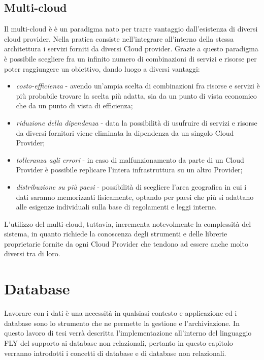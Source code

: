\subsection{Multi-cloud}
Il multi-cloud è è un paradigma nato per trarre vantaggio dall'esistenza di diversi cloud provider. Nella pratica consiste nell'integrare all'interno della stessa architettura i servizi forniti da diversi Cloud provider. Grazie a questo paradigma è possibile scegliere fra un infinito numero di combinazioni di servizi e risorse per poter raggiungere un obiettivo, dando luogo a diversi vantaggi:
\begin{itemize}
    
    \item \textit{costo-efficienza} - avendo un'ampia scelta di combinazioni fra risorse e servizi è più probabile trovare la scelta più adatta, sia da un punto di vista economico che da un punto di vista di efficienza;
    \item \textit{riduzione della dipendenza} - data la possibilità di usufruire di servizi e risorse da diversi fornitori viene eliminata la dipendenza da un singolo Cloud Provider;
    \item \textit{tolleranza agli errori} - in caso di malfunzionamento da parte di un Cloud Provider è possibile replicare l'intera infrastruttura su un altro Provider;
    \item \textit{distribuzione su più paesi} - possibilità di scegliere l'area geografica in cui i dati saranno memorizzati fisicamente, optando per paesi che più si adattano alle esigenze individuali sulla base di regolamenti e leggi interne.

\end{itemize}
L'utilizzo del multi-cloud, tuttavia, incrementa notevolmente la complessità del sistema, in quanto richiede la conoscenza degli strumenti e delle librerie proprietarie fornite da ogni Cloud Provider che tendono ad essere anche molto diversi tra di loro.

\section{Database}
Lavorare con i dati è una necessità in qualsiasi contesto e applicazione ed i database sono lo strumento che ne permette la gestione e l'archiviazione. In questo lavoro di tesi verrà descritta l'implementazione all'interno del linguaggio FLY del supporto ai database non relazionali, pertanto in questo capitolo verranno introdotti i concetti di database e di database non relazionali.

